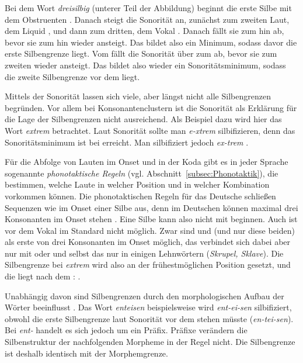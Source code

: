 Bei dem Wort \textit{dreisilbig} (unterer Teil der Abbildung) beginnt die erste Silbe mit dem Obstruenten \textipa{[d]}. Danach steigt die Sonorität an, zunächst zum zweiten Laut, dem Liquid \textipa{[K]}, und dann zum dritten, dem Vokal \textipa{[\t*{aI}]}. Danach fällt sie zum \textipa{[z]} hin ab, bevor sie zum \textipa{[I]} hin wieder ansteigt. Das \textipa{[z]} bildet also ein Minimum, sodass davor die erste Silbengrenze liegt. Vom \textipa{[I]} fällt die Sonorität über \textipa{[l]} zum \textipa{[b]} ab, bevor sie zum zweiten \textipa{[I]} wieder ansteigt. Das \textipa{[b]} bildet also wieder ein Sonoritätsminimum, sodass die zweite Silbengrenze vor dem \textipa{[b]} liegt. 

Mittels der Sonorität lassen sich viele, aber längst nicht alle Silbengrenzen begründen. Vor allem bei Konsonantenclustern ist die Sonorität als Erklärung für die Lage der Silbengrenzen nicht ausreichend. Als Beispiel dazu wird hier das Wort \textit{extrem}  betrachtet. Laut Sonorität sollte man \textit{e-xtrem}  silbifizieren, denn das Sonoritätsminimum ist bei \textipa{[k]} erreicht. Man silbifiziert jedoch \textit{ex-trem} .

Für die Abfolge von Lauten im Onset und in der Koda gibt es in jeder Sprache sogenannte \textit{phonotaktische Regeln} (vgl. Abschnitt~\ref{subsec:Phonotaktik}), die bestimmen, welche Laute in welcher Position und in welcher Kombination vorkommen können. Die phonotaktischen Regeln für das Deutsche schließen Sequenzen wie \textipa{[kstK]} im Onset einer Silbe aus, denn im Deutschen können maximal drei Konsonanten im Onset stehen \citep[68--69]{Hall1992}. Eine Silbe kann also nicht mit \textipa{[kstK]} beginnen. Auch \textipa{[stK]} ist vor dem Vokal im Standard nicht möglich. Zwar sind  und  (und nur diese beiden) als erste von drei Konsonanten im Onset möglich, das  verbindet sich dabei aber nur mit  oder  und selbst das nur in einigen Lehnwörtern (\textit{Skrupel, Sklave}). Die Silbengrenze bei \textit{extrem} wird also an der frühestmöglichen Position gesetzt, und die liegt nach dem : .

Unabhängig davon sind Silbengrenzen durch den morphologischen Aufbau der Wörter beeinflusst \citep[72--73]{Bergmann2018}. Das Wort \textit{enteisen} beispielsweise wird \textit{ent-ei-sen} silbifiziert, obwohl die erste Silbengrenze laut Sonorität vor dem  stehen müsste (\textit{en-tei-sen}). Bei \textit{ent-} handelt es sich jedoch um ein Präfix. Präfixe verändern die Silbenstruktur der nachfolgenden Morpheme in der Regel nicht. Die Silbengrenze ist deshalb identisch mit der Morphemgrenze.

